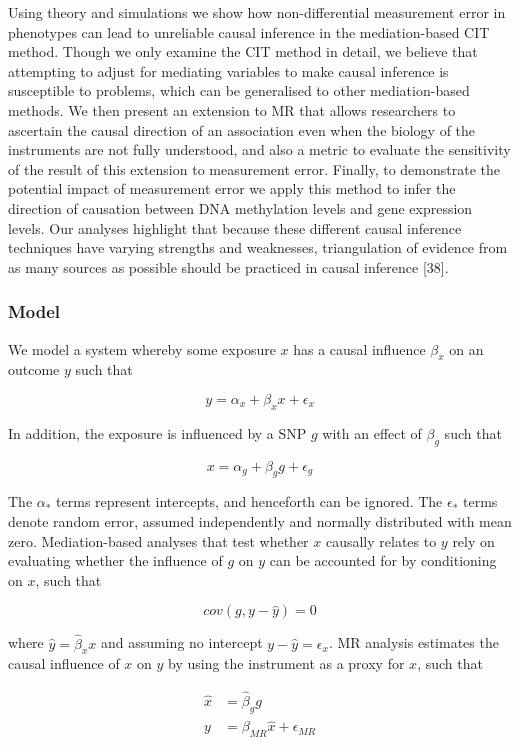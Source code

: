 \documentclass[]{article}
\begin{document}
Using theory and simulations we show how non-differential measurement
error in phenotypes can lead to unreliable causal inference in the
mediation-based CIT method. Though we only examine the CIT method in
detail, we believe that attempting to adjust for mediating variables to
make causal inference is susceptible to problems, which can be
generalised to other mediation-based methods. We then present an
extension to MR that allows researchers to ascertain the causal
direction of an association even when the biology of the instruments are
not fully understood, and also a metric to evaluate the sensitivity of
the result of this extension to measurement error. Finally, to
demonstrate the potential impact of measurement error we apply this
method to infer the direction of causation between DNA methylation
levels and gene expression levels. Our analyses highlight that because
these different causal inference techniques have varying strengths and
weaknesses, triangulation of evidence from as many sources as possible
should be practiced in causal inference {[}38{]}.

\hypertarget{model}{%
\subsubsection{Model}\label{model}}

We model a system whereby some exposure \(x\) has a causal influence
\(\beta_x\) on an outcome \(y\) such that

\[
y = \alpha_x + \beta_x x + \epsilon_x
\]

In addition, the exposure is influenced by a SNP \(g\) with an effect of
\(\beta_g\) such that

\[
x = \alpha_g + \beta_g g + \epsilon_g
\]

The \(\alpha_*\) terms represent intercepts, and henceforth can be
ignored. The \(\epsilon_*\) terms denote random error, assumed
independently and normally distributed with mean zero. Mediation-based
analyses that test whether \(x\) causally relates to \(y\) rely on
evaluating whether the influence of \(g\) on \(y\) can be accounted for
by conditioning on \(x\), such that

\[
cov(g, y - \hat{y}) = 0
\]

where \(\hat{y} = \hat{\beta}_x x\) and assuming no intercept
\(y - \hat{y} = \epsilon_x\). MR analysis estimates the causal influence
of \(x\) on \(y\) by using the instrument as a proxy for \(x\), such
that

\[
\begin{aligned}
\hat{x} & = \hat{\beta}_g g \\
y       & = \beta_{MR}\hat{x} + \epsilon_{MR}
\end{aligned}
\]
\end{document}
